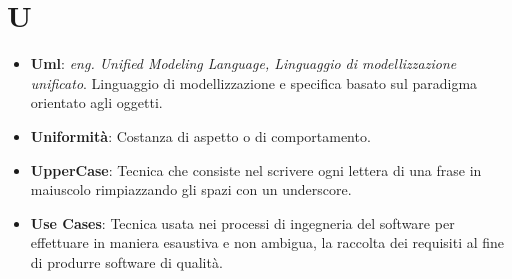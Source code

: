 \section{U}
\begin{itemize}
	\item
	\textbf{Uml}: \textit{eng. Unified Modeling Language, Linguaggio di modellizzazione unificato}. Linguaggio di modellizzazione e specifica basato sul paradigma orientato agli oggetti.
	\item
	\textbf{Uniformità}: Costanza di aspetto o di comportamento.
	\item
	\textbf{Upper\textunderscore Case}: Tecnica che consiste nel scrivere ogni lettera di una frase in maiuscolo rimpiazzando gli spazi con un underscore.
	\item
	\textbf{Use Cases}: Tecnica usata nei processi di ingegneria del software per effettuare in maniera esaustiva e non ambigua, la raccolta dei requisiti al fine di produrre software di qualità.
\end{itemize}
\newpage